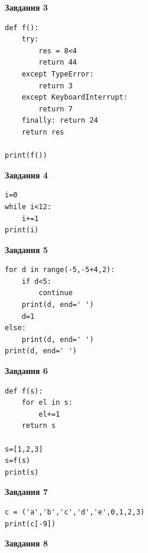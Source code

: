 \documentclass[12pt, ukrainian]{article}
\begin{document}
{{{{{{{{{{{{{{{{{{{\begin{minipage}[t]{7.5cm}
\begin{center}
\textbf{Завдання 3}
\end{center}

\begin{verbatim}
def f():
    try:
        res = 8<4
        return 44
    except TypeError: 
        return 3
    except KeyboardInterrupt: 
        return 7
    finally: return 24
    return res

print(f())
\end{verbatim}



\begin{center}
\textbf{Завдання 4}
\end{center}

\begin{verbatim}
i=0
while i<12:
    i+=1
print(i)
\end{verbatim}

\end{minipage}
\vline \hspace{6mm}
\begin{minipage}[t]{10.5cm}

\begin{center}
\textbf{Завдання 5}
\end{center}

\begin{verbatim}
for d in range(-5,-5+4,2):
    if d<5:
        continue
    print(d, end=' ')
    d=1
else:
    print(d, end=' ')
print(d, end=' ')
\end{verbatim}



\begin{center}
\textbf{Завдання 6}
\end{center}

\begin{verbatim}
def f(s):
    for el in s:
        el+=1
    return s

s=[1,2,3]
s=f(s)
print(s)
\end{verbatim}



\begin{center}
\textbf{Завдання 7}
\end{center}

\begin{verbatim}
c = ('a','b','c','d','e',0,1,2,3)
print(c[-9])
\end{verbatim}



\begin{center}
\textbf{Завдання 8}
\end{center}


\end{minipage}}}}}}}}}}}}}}}}}}}}
\end{document}
